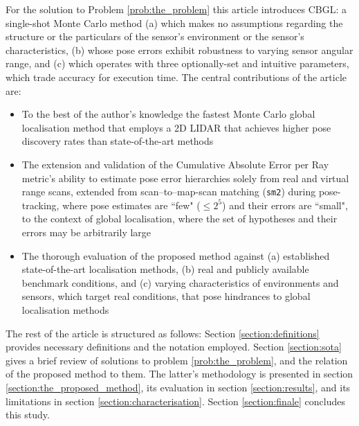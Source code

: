 For the solution to Problem \ref{prob:the_problem} this article introduces
CBGL: a single-shot Monte Carlo method
(a) which makes no assumptions regarding the structure or the particulars of the
sensor's environment or the sensor's characteristics,
(b) whose pose errors exhibit robustness to varying sensor angular range, and
(c) which operates with three optionally-set and intuitive parameters, which
trade accuracy for execution time.
The central contributions of the article are:
\begin{itemize}
  \item To the best of the author's knowledge the fastest Monte Carlo global
        localisation method that employs a 2D LIDAR that achieves higher
        pose discovery rates than state-of-the-art methods
  \item The extension and validation of the Cumulative Absolute Error per Ray
        metric's ability to estimate pose error hierarchies solely from real
        and virtual range scans, extended from scan--to--map-scan matching
        (\texttt{sm2}) during pose-tracking, where pose estimates are ``few"
        ($\leq$$2^5$) and their errors are ``small", to the context of global
        localisation, where the set of hypotheses and their errors may be
        arbitrarily large
  \item The thorough evaluation of the proposed method against (a) established
        state-of-the-art localisation methods, (b) real and publicly available
        benchmark conditions, and (c) varying characteristics of environments
        and sensors, which target real conditions, that pose hindrances to
        global localisation methods
\end{itemize}

The rest of the article is structured as follows: Section
\ref{section:definitions} provides necessary definitions and the notation
employed. Section \ref{section:sota} gives a brief review of
solutions to problem \ref{prob:the_problem}, and the relation of the proposed
method to them. The latter's methodology is presented in section
\ref{section:the_proposed_method}, its evaluation in section
\ref{section:results}, and its limitations in section
\ref{section:characterisation}. Section \ref{section:finale} concludes this
study.
